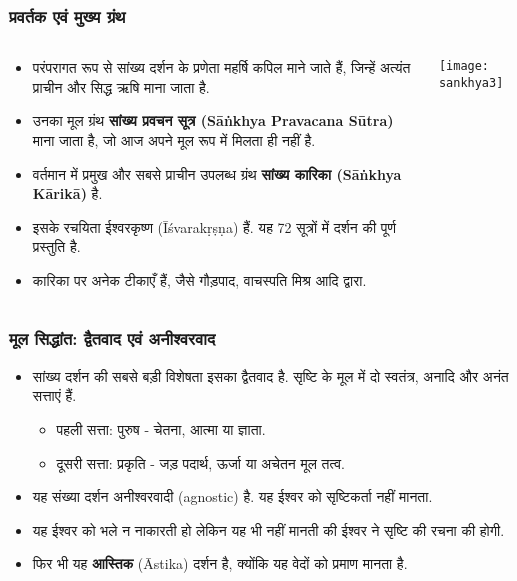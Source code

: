 \begin{frame}[fragile]\frametitle{प्रवर्तक एवं मुख्य ग्रंथ}
\begin{columns}
    \begin{column}[T]{0.6\linewidth}
      \begin{itemize}
        \item परंपरागत रूप से सांख्य दर्शन के प्रणेता महर्षि कपिल माने जाते हैं, जिन्हें अत्यंत प्राचीन और सिद्ध ऋषि माना जाता है.
        \item उनका मूल ग्रंथ \textbf{सांख्य प्रवचन सूत्र (Sāṅkhya Pravacana Sūtra)} माना जाता है, जो आज अपने मूल रूप में मिलता ही नहीं है.
        \item वर्तमान में प्रमुख और सबसे प्राचीन उपलब्ध ग्रंथ \textbf{सांख्य कारिका (Sāṅkhya Kārikā)} है.
        \item इसके रचयिता ईश्वरकृष्ण (Īśvarakṛṣṇa) हैं. यह 72 सूत्रों में दर्शन की पूर्ण प्रस्तुति है.
        \item कारिका पर अनेक टीकाएँ हैं, जैसे गौड़पाद, वाचस्पति मिश्र आदि द्वारा.
      \end{itemize}
    \end{column}
    \begin{column}[T]{0.4\linewidth}
      \begin{center}
        \texttt{[image: sankhya3]}
      \end{center}	
    \end{column}
\end{columns}
\end{frame}

\begin{frame}[fragile]\frametitle{मूल सिद्धांत: द्वैतवाद एवं अनीश्वरवाद}
      \begin{itemize}
	\item सांख्य दर्शन की सबसे बड़ी विशेषता इसका द्वैतवाद है. सृष्टि के मूल में दो स्वतंत्र, अनादि और अनंत सत्ताएं हैं.
        \begin{itemize}
            \item पहली सत्ता: पुरुष - चेतना, आत्मा या ज्ञाता.
            \item दूसरी सत्ता: प्रकृति - जड़ पदार्थ, ऊर्जा या अचेतन मूल तत्व.
        \end{itemize}
	\item यह संख्या दर्शन अनीश्वरवादी (agnostic) है. यह ईश्वर को सृष्टिकर्ता नहीं मानता.
	\item यह ईश्वर को भले न नाकारती हो लेकिन यह भी नहीं मानती की ईश्वर ने सृष्टि की रचना की होगी.
	\item फिर भी यह \textbf{आस्तिक} (Āstika) दर्शन है, क्योंकि यह वेदों को प्रमाण मानता है.
	  \end{itemize}
\end{frame}

